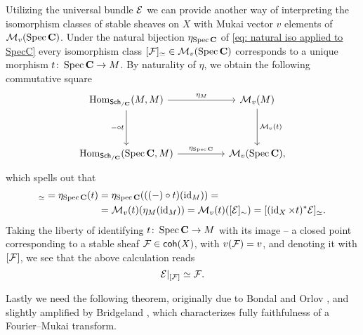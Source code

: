 \begin{remark}
    \label{Points of M are sheaves}
Utilizing the universal bundle $\mathcal E$ we can provide another way of interpreting the isomorphism classes of stable sheaves on $X$ with Mukai vector $v$ \ie elements of $\mathcal M_v(\operatorname{Spec}\mathbf C)$. Under the natural bijection $\eta_{\operatorname{Spec}\mathbf C}$ of \eqref{eq: natural iso applied to SpecC} every isomorphism class $[\mathcal F]_\simeq \in \mathcal M_v(\operatorname{Spec}\mathbf C)$ corresponds to a unique morphism $t \colon \operatorname{Spec}\mathbf C \to M$. By naturality of $\eta$, we obtain the following commutative square 
\[\begin{tikzcd}[column sep = normal, row sep = 1.8em]
	\Hom_{\sch{\C}}(M, M) && \M_v(M) \\
	\\
	\Hom_{\sch{\C}}(\spec{\C}, M) && \M_v(\spec{\C}),
	\arrow["{\eta_M}", from=1-1, to=1-3]
	\arrow["{- \circ t}"', from=1-1, to=3-1]
	\arrow["{\M_v(t)}", from=1-3, to=3-3]
	\arrow["\eta_{\spec{\C}}", from=3-1, to=3-3]
\end{tikzcd}\]
which spells out that 
\begin{align*}
    [\F]_\iso = \eta_{\spec{\C}}(t) &= \eta_{\spec{\C}}(((-)\circ t)(\id{M})) = \\
    &= \M_v(t)(\eta_M(\id{M})) = \M_v(t)([\E]_\sim) = [(\id{X} \times t)^*\E]_\iso.
\end{align*}
Taking the liberty of identifying $t \colon \operatorname{Spec}\mathbf C \to M$ with its image -- a closed point corresponding to a stable sheaf $\mathcal F \in \mathsf{coh}(X)$, with $v(\mathcal F) = v$, and denoting it with $[\mathcal F]$, we see that the above calculation reads
\[
    \mathcal E|_{[\mathcal F]} \simeq \mathcal F.
\]
\end{remark}



Lastly we need the following theorem, originally due to Bondal and Orlov \cite[]{BondalOrlov1995}, and slightly amplified by Bridgeland \cite[]{bridgeland2019equivalencestriangulatedcategoriesfouriermukai}, which characterizes fully faithfulness of a Fourier--Mukai transform. 

